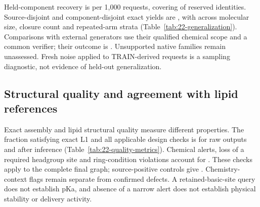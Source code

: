 Held-component recovery is  per 1,000 requests, covering
 of reserved identities. Source-disjoint and component-disjoint
exact yields are , with 
across molecular size, closure count and repeated-arm strata (Table~\ref{tab:22-generalization}).
Comparisons with external generators use their qualified chemical scope and a common verifier;
their outcome is . Unsupported native families remain
unassessed. Fresh noise applied to TRAIN-derived requests is a sampling diagnostic, not evidence
of held-out generalization.

\subsection{Structural quality and agreement with lipid references}
Exact assembly and lipid structural quality measure different properties. The fraction satisfying
exact L1 and all applicable design checks is  for raw outputs
and  after inference
(Table~\ref{tab:22-quality-metrics}). Chemical alerts, loss of a required headgroup site and
ring-condition violations account for . These checks
apply to the complete final graph; source-positive controls give
. Chemistry-context flags remain separate
from confirmed defects. A retained-basic-site query does not establish pKa, and absence of a narrow
alert does not establish physical stability or delivery activity.


